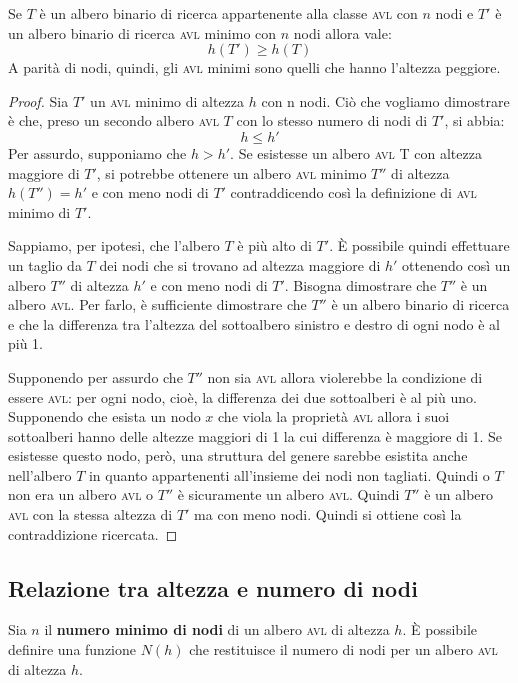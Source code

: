 \begin{propbox}
Se $T$ è un albero binario di ricerca appartenente alla classe \textsc{avl} con $n$ nodi e $T'$ è un albero binario di ricerca \textsc{avl} minimo con $n$ nodi allora vale:
\begin{displaymath}
	h(T') \geq h(T)
\end{displaymath}
A parità di nodi, quindi, gli \textsc{avl} minimi sono quelli che hanno l'altezza peggiore.
\end{propbox}
\begin{proof}
Sia $T'$ un \textsc{avl} minimo di altezza $h$ con n nodi. Ciò che vogliamo dimostrare è che, preso un secondo albero \textsc{avl} $T$ con lo stesso numero di nodi di $T'$, si abbia:
\begin{displaymath}
h \leq h'
\end{displaymath}
Per assurdo, supponiamo che $h>h'$. Se esistesse un albero \textsc{avl} T con altezza maggiore di $T'$, si potrebbe ottenere un albero \textsc{avl} minimo $T''$ di altezza $h(T'')=h'$ e con meno nodi di $T'$ contraddicendo così la definizione di \textsc{avl} minimo di $T'$.

Sappiamo, per ipotesi, che l'albero $T$ è più alto di $T'$. È possibile quindi effettuare un taglio da $T$ dei nodi che si trovano ad altezza maggiore di $h'$ ottenendo così un albero $T''$ di altezza $h'$ e con meno nodi di $T'$. Bisogna dimostrare che $T''$ è un albero \textsc{avl}. Per farlo, è sufficiente dimostrare che $T''$ è un albero binario di ricerca e che la differenza tra l'altezza del sottoalbero sinistro e destro di ogni nodo è al più 1.

Supponendo per assurdo che $T''$ non sia \textsc{avl} allora violerebbe la condizione di essere \textsc{avl}: per ogni nodo, cioè, la differenza dei due sottoalberi è al più uno. Supponendo che esista un nodo $x$ che viola la proprietà \textsc{avl} allora i suoi sottoalberi hanno delle altezze maggiori di 1 la cui differenza è maggiore di 1. Se esistesse questo nodo, però, una struttura del genere sarebbe esistita anche nell'albero $T$ in quanto appartenenti all'insieme dei nodi non tagliati. Quindi o $T$ non era un albero \textsc{avl} o $T''$ è sicuramente un albero \textsc{avl}. Quindi $T''$ è un albero \textsc{avl} con la stessa altezza di $T'$ ma con meno nodi. Quindi si ottiene così la contraddizione ricercata.
\end{proof}

\subsection{Relazione tra altezza e numero di nodi}
Sia $n$ il \textbf{numero minimo di nodi} di un albero \textsc{avl} di altezza $h$. È possibile definire una funzione $N(h)$ che restituisce il numero di nodi per un albero \textsc{avl} di altezza $h$.

